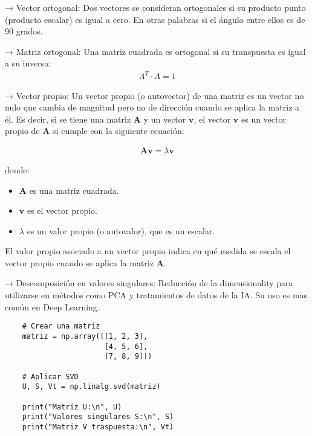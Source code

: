 \documentclass{templateNote}
\begin{document}
→ Vector ortogonal: Dos vectores se consideran ortogonales si su producto punto (producto escalar) es igual a cero. En otras palabras si el ángulo entre ellos es de 90 grados.


→ Matriz ortogonal: Una matriz cuadrada es ortogonal si su transpuesta es igual a su inversa:
\begin{align*}
    A^T \cdot A = 1
\end{align*}

→ Vector propio: Un vector propio (o autovector) de una matriz es un vector no nulo que cambia de magnitud pero no de dirección cuando se aplica la matriz a él. Es decir, si se tiene una matriz \( \mathbf{A} \) y un vector \( \mathbf{v} \), el vector \( \mathbf{v} \) es un vector propio de \( \mathbf{A} \) si cumple con la siguiente ecuación:

\begin{align*}
\mathbf{A} \mathbf{v} = \lambda \mathbf{v}
\end{align*}

donde:

\begin{itemize}
    \item \( \mathbf{A} \) es una matriz cuadrada.
    \item \( \mathbf{v} \) es el vector propio.
    \item \( \lambda \) es un valor propio (o autovalor), que es un escalar.
\end{itemize}

El valor propio asociado a un vector propio indica en qué medida se escala el vector propio cuando se aplica la matriz \( \mathbf{A} \).



→ Descomposición en valores singulares: Reducción de la dimensionality para utilizarse en métodos como PCA y tratamientos de datos de la IA. Su uso es mas común en Deep Learning.
\begin{lstlisting}
    # Crear una matriz
    matriz = np.array([[1, 2, 3],
                       [4, 5, 6],
                       [7, 8, 9]])

    # Aplicar SVD
    U, S, Vt = np.linalg.svd(matriz)

    print("Matriz U:\n", U)
    print("Valores singulares S:\n", S)
    print("Matriz V traspuesta:\n", Vt)
\end{lstlisting}
\end{document}

